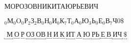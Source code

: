 \documentclass[a4paper, fontsize=12pt]{article}
\begin{document}
\section{}

МОРОЗОВНИКИТАЮРЬЕВИЧ\medskip

\noindent $ _0\text{М}_0\text{O}_0\text{Р}_2\text{З}_2\text{В}_0\text{Н}_0\text{И}_0\text{К}_7
\text{Т}_0\text{А}_0\text{Ю}_3\text{Ь}_0\text{Е}_0\text{В}_7\text{Ч}0\$$\medskip

\noindent $\underbracket{\text{\ М}}\ \underbracket{\text{О}}\ \underbracket{\text{Р}}\ 
\underbracket{\text{ОЗ}}\ \underbracket{\text{ОВ}}\ \underbracket{\text{Н}}\ \underbracket{\text{И}}\ 
\underbracket{\text{К}}\ \underbracket{\text{ИТ}}\ \underbracket{\text{А}}\ \underbracket{\text{Ю}}\ 
\underbracket{\text{РЬ}}\ \underbracket{\text{Е}}\ \underbracket{\text{В}}\ \underbracket{\text{ИЧ} }\ 
\underbracket{ \text{\$}}$

\section{}
\end{document}
